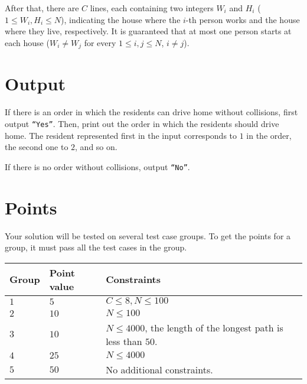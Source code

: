 After that, there are $C$ lines, each containing two integers $W_i$ and $H_i$ ($1 \leq W_i,H_i \leq N$), indicating the
house where the $i$-th person works and the house where they live, respectively. It is guaranteed that at most one person
starts at each house ($W_i \neq W_j$ for every $1 \leq i, j \leq N$, $i \neq j$).

\section*{Output}
If there is an order in which the residents can drive home without collisions, first output \texttt{``Yes''}.
Then, print out the order in which the residents should drive home. The resident represented first in the
input corresponds to $1$ in the order, the second one to $2$, and so on.

If there is no order without collisions, output \texttt{``No''}.

\section*{Points}
Your solution will be tested on several test case groups.
To get the points for a group, it must pass all the test cases in the group.

\noindent
\begin{tabular}{| l | l | p{12cm} |}
  \hline
  \textbf{Group} & \textbf{Point value} & \textbf{Constraints} \\ \hline
  $1$    & $5$        & $C \leq 8, N \leq 100$ \\ \hline
  $2$    & $10$       & $N \leq 100$ \\ \hline
  $3$    & $10$       & $N \leq 4000$, the length of the longest path is less than $50$. \\ \hline
  $4$    & $25$       & $N \leq 4000$ \\ \hline
  $5$    & $50$       & No additional constraints. \\ \hline
\end{tabular}

